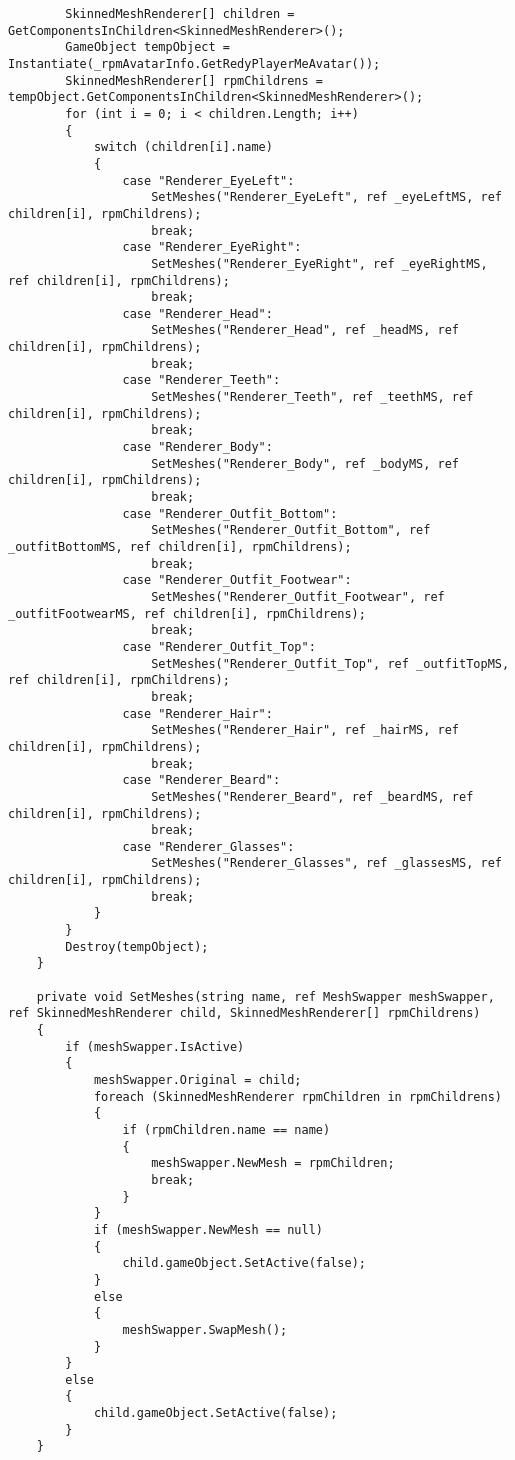 \begin{verbatim}
        SkinnedMeshRenderer[] children = GetComponentsInChildren<SkinnedMeshRenderer>();
        GameObject tempObject = Instantiate(_rpmAvatarInfo.GetRedyPlayerMeAvatar());
        SkinnedMeshRenderer[] rpmChildrens = tempObject.GetComponentsInChildren<SkinnedMeshRenderer>();
        for (int i = 0; i < children.Length; i++)
        {
            switch (children[i].name)
            {
                case "Renderer_EyeLeft":
                    SetMeshes("Renderer_EyeLeft", ref _eyeLeftMS, ref children[i], rpmChildrens);
                    break;
                case "Renderer_EyeRight":
                    SetMeshes("Renderer_EyeRight", ref _eyeRightMS, ref children[i], rpmChildrens);
                    break;
                case "Renderer_Head":
                    SetMeshes("Renderer_Head", ref _headMS, ref children[i], rpmChildrens);
                    break;
                case "Renderer_Teeth":
                    SetMeshes("Renderer_Teeth", ref _teethMS, ref children[i], rpmChildrens);
                    break;
                case "Renderer_Body":
                    SetMeshes("Renderer_Body", ref _bodyMS, ref children[i], rpmChildrens);
                    break;
                case "Renderer_Outfit_Bottom":
                    SetMeshes("Renderer_Outfit_Bottom", ref _outfitBottomMS, ref children[i], rpmChildrens);
                    break;
                case "Renderer_Outfit_Footwear":
                    SetMeshes("Renderer_Outfit_Footwear", ref _outfitFootwearMS, ref children[i], rpmChildrens);
                    break;
                case "Renderer_Outfit_Top":
                    SetMeshes("Renderer_Outfit_Top", ref _outfitTopMS, ref children[i], rpmChildrens);
                    break;
                case "Renderer_Hair":
                    SetMeshes("Renderer_Hair", ref _hairMS, ref children[i], rpmChildrens);
                    break;
                case "Renderer_Beard":
                    SetMeshes("Renderer_Beard", ref _beardMS, ref children[i], rpmChildrens);
                    break;
                case "Renderer_Glasses":
                    SetMeshes("Renderer_Glasses", ref _glassesMS, ref children[i], rpmChildrens);
                    break;
            }
        }
        Destroy(tempObject);
    }

    private void SetMeshes(string name, ref MeshSwapper meshSwapper, ref SkinnedMeshRenderer child, SkinnedMeshRenderer[] rpmChildrens)
    {
        if (meshSwapper.IsActive)
        {
            meshSwapper.Original = child;
            foreach (SkinnedMeshRenderer rpmChildren in rpmChildrens)
            {
                if (rpmChildren.name == name)
                {
                    meshSwapper.NewMesh = rpmChildren;
                    break;
                }
            }
            if (meshSwapper.NewMesh == null)
            {
                child.gameObject.SetActive(false);
            }
            else
            {
                meshSwapper.SwapMesh();
            }
        }
        else
        {
            child.gameObject.SetActive(false);
        }
    }


\end{verbatim}
